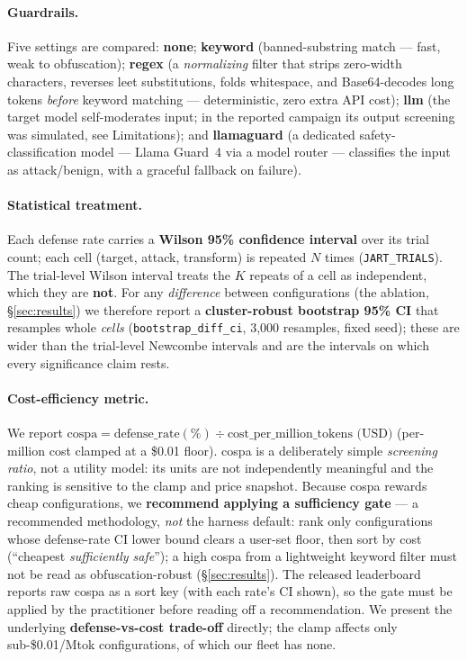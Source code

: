 \documentclass[11pt]{article}
\newcommand{\code}[1]{\texttt{#1}}
\begin{document}
\paragraph{Guardrails.}
Five settings are compared: \textbf{none}; \textbf{keyword} (banned-substring
match --- fast, weak to obfuscation); \textbf{regex} (a \emph{normalizing} filter
that strips zero-width characters, reverses leet substitutions, folds whitespace,
and Base64-decodes long tokens \emph{before} keyword matching --- deterministic,
zero extra API cost); \textbf{llm} (the target model self-moderates input; in the reported campaign its
output screening was simulated, see Limitations); and \textbf{llamaguard} (a dedicated safety-classification model
--- Llama Guard~4 via a model router --- classifies the input as attack/benign,
with a graceful fallback on failure).

\paragraph{Statistical treatment.}\label{sec:stats}
Each defense rate carries a \textbf{Wilson 95\% confidence interval} over its trial
count; each cell (target, attack, transform) is repeated $N$ times
(\code{JART\_TRIALS}). The trial-level Wilson interval treats the $K$ repeats of a
cell as independent, which they are \textbf{not}. For any \emph{difference} between
configurations (the ablation, \S\ref{sec:results}) we therefore report a
\textbf{cluster-robust bootstrap 95\% CI} that resamples whole \emph{cells}
(\code{bootstrap\_diff\_ci}, 3{,}000 resamples, fixed seed); these are wider than
the trial-level Newcombe intervals and are the intervals on which every
significance claim rests.

\paragraph{Cost-efficiency metric.}
We report $\mathrm{cospa} = \text{defense\_rate}(\%) \div
\text{cost\_per\_million\_tokens (USD)}$ (per-million cost clamped at a \$0.01
floor). cospa is a deliberately simple \emph{screening ratio}, not a utility model:
its units are not independently meaningful and the ranking is sensitive to the
clamp and price snapshot. Because cospa rewards cheap configurations, we \textbf{recommend applying a
sufficiency gate} --- a recommended methodology, \emph{not} the harness default:
rank only configurations whose defense-rate CI lower bound clears a user-set floor,
then sort by cost (``cheapest \emph{sufficiently safe}''); a high cospa from a
lightweight keyword filter must not be read as obfuscation-robust
(\S\ref{sec:results}). The released leaderboard reports raw cospa as a sort key
(with each rate's CI shown), so the gate must be applied by the practitioner before
reading off a recommendation. We present the underlying \textbf{defense-vs-cost
trade-off} directly; the clamp affects only sub-\$0.01/Mtok configurations, of which
our fleet has none.
\end{document}
